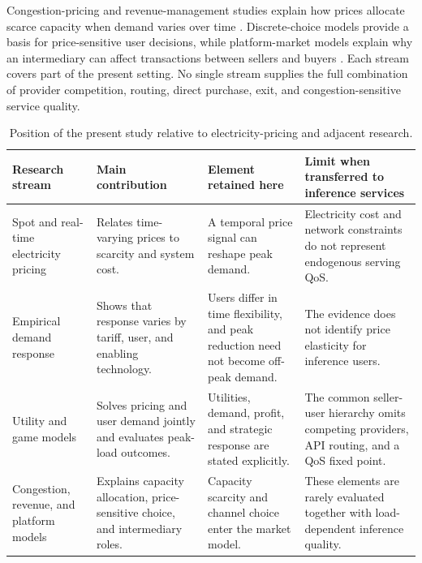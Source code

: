 \documentclass[11pt,a4paper]{article}
\begin{document}
Congestion-pricing and revenue-management studies explain how prices allocate scarce capacity when demand varies over time \cite{vickrey1969congestion,arnott1990bottleneck,gallego1994dynamic,elmaghraby2003dynamic,bitran2003overview,talluri2004revenue,phillips2005pricing}. Discrete-choice models provide a basis for price-sensitive user decisions, while platform-market models explain why an intermediary can affect transactions between sellers and buyers \cite{mcfadden1974conditional,anderson1992discrete,train2009discrete,rochet2003platform}. Each stream covers part of the present setting. No single stream supplies the full combination of provider competition, routing, direct purchase, exit, and congestion-sensitive service quality.

\begin{table}[H]
\centering
\caption{Position of the present study relative to electricity-pricing and adjacent research.}
\label{tab:literature_positioning}
\small
\begin{tabular}{@{}>{\raggedright\arraybackslash}p{}>{\raggedright\arraybackslash}p{}>{\raggedright\arraybackslash}p{}>{\raggedright\arraybackslash}p{}@{}}
\toprule
Research stream & Main contribution & Element retained here & Limit when transferred to inference services \\
\midrule
Spot and real-time electricity pricing \cite{schweppe1988spot,borenstein2005long}
& Relates time-varying prices to scarcity and system cost.
& A temporal price signal can reshape peak demand.
& Electricity cost and network constraints do not represent endogenous serving QoS. \\
Empirical demand response \cite{faruqui2010household,allcott2011rethinking}
& Shows that response varies by tariff, user, and enabling technology.
& Users differ in time flexibility, and peak reduction need not become off-peak demand.
& The evidence does not identify price elasticity for inference users. \\
Utility and game models \cite{samadi2010optimal,yang2013game,yu2016supply,srinivasan2017game}
& Solves pricing and user demand jointly and evaluates peak-load outcomes.
& Utilities, demand, profit, and strategic response are stated explicitly.
& The common seller-user hierarchy omits competing providers, API routing, and a QoS fixed point. \\
Congestion, revenue, and platform models \cite{vickrey1969congestion,talluri2004revenue,train2009discrete,rochet2003platform}
& Explains capacity allocation, price-sensitive choice, and intermediary roles.
& Capacity scarcity and channel choice enter the market model.
& These elements are rarely evaluated together with load-dependent inference quality. \\
\bottomrule
\end{tabular}
\end{table}
\end{document}
